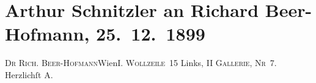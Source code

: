 

         
         \newcommand{\erwaehntePersonen}{Personen: Richard Beer-Hofmann}
         \newcommand{\erwaehnteOrte}{Orte: I., Innere Stadt, Wien, Wollzeile}
         \newcommand{\erwaehnteWerke}{Werke: Gläubiger}
               \section[Arthur Schnitzler an Richard Beer-Hofmann, 25. 12. 1899]{ Arthur Schnitzler an Richard Beer-Hofmann,
               25. 12. 1899}\nopagebreak{}\rehead{ }\begin{ledgroupsized}[t]{13cm}\normalsize\beginnumbering \toendnotes[C]{\smallbreak\pagebreak[2]} 
\toendnotes[C]{\smallbreak}\pstart{}{\pb}\textsc{Dr Rich.
                     Beer-Hofmann}\pend{}\pstart{}Wien\pend{}\pstart{}\textsc{I. Wollzeile 15}\pend{}{\bigskip}\pstart
           \noindent{}{\pb}Links, \textsc{II Gallerie, Nr 7}.\pend
           \pstart Herzlichſt \spacefill\mbox{A.}\pend{}
         
         \endnumbering{}\end{ledgroupsized}  \newcommand{\dateiname}{L01008}\newcommand{\titel}{Arthur Schnitzler an Richard Beer-Hofmann, 25. 12. 1899}\newcommand{\editorInnen}{Martin Anton Müller und Gerd-Hermann Susen}
      